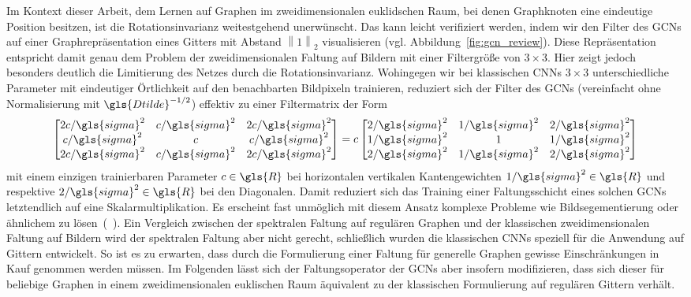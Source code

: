 Im Kontext dieser Arbeit, dem Lernen auf Graphen im zweidimensionalen euklidschen Raum, bei denen Graphknoten eine eindeutige Position besitzen, ist die Rotationsinvarianz weitestgehend unerwünscht.
Das kann leicht verifiziert werden, indem wir den Filter des \glspl{GCN} auf einer Graphrepräsentation eines Gitters mit Abstand $\left\|1\right\|_2$ visualisieren (vgl. Abbildung~\ref{fig:gcn_review}).
Diese Repräsentation entspricht damit genau dem Problem der zweidimensionalen Faltung auf Bildern mit einer Filtergröße von $3 \times 3$.
Hier zeigt jedoch besonders deutlich die Limitierung des Netzes durch die Rotationsinvarianz.
Wohingegen wir bei klassischen \glspl{CNN} $3 \times 3$ unterschiedliche Parameter mit eindeutiger Örtlichkeit auf den benachbarten Bildpixeln trainieren, reduziert sich der Filter des \glspl{GCN} (vereinfacht ohne Normalisierung mit $\gls{Dtilde}^{-1/2}$) effektiv zu einer Filtermatrix der Form
\begin{equation*}
  \begin{bmatrix}
    2c/\gls{sigma}^2 & c/\gls{sigma}^2 & 2c/\gls{sigma}^2\\
    c/\gls{sigma}^2 & c  & c/\gls{sigma}^2\\
    2c/\gls{sigma}^2 & c/\gls{sigma}^2 & 2c/\gls{sigma}^2
  \end{bmatrix} = c \begin{bmatrix}
    2/\gls{sigma}^2 & 1/\gls{sigma}^2 & 2/\gls{sigma}^2\\
    1/\gls{sigma}^2 & 1  & 1/\gls{sigma}^2\\
    2/\gls{sigma}^2 & 1/\gls{sigma}^2 & 2/\gls{sigma}^2
  \end{bmatrix}
\end{equation*}
mit einem einzigen trainierbaren Parameter $c \in \gls{R}$ bei horizontalen \bzw{} vertikalen Kantengewichten $1/\gls{sigma}^2 \in \gls{R}$ und respektive $2/\gls{sigma}^2 \in \gls{R}$ bei den Diagonalen.
Damit reduziert sich das Training einer Faltungsschicht eines solchen \glspl{GCN} letztendlich auf eine Skalarmultiplikation.
Es erscheint fast unmöglich mit diesem Ansatz komplexe Probleme wie \zB{} Bildsegementierung oder ähnlichem zu lösen~(\vgl{}~\cite{gcn_review}).
Ein Vergleich zwischen der spektralen Faltung auf regulären Graphen und der klassischen zweidimensionalen Faltung auf Bildern wird der spektralen Faltung aber nicht gerecht, schließlich wurden die klassischen \glspl{CNN} speziell für die Anwendung auf Gittern entwickelt.
So ist es zu erwarten, dass durch die Formulierung einer Faltung für generelle Graphen gewisse Einschränkungen in Kauf genommen werden müssen.
Im Folgenden lässt sich der Faltungsoperator der \glspl{GCN} aber insofern modifizieren, dass sich dieser für beliebige Graphen in einem zweidimensionalen euklischen Raum äquivalent zu der klassischen Formulierung auf regulären Gittern verhält.

